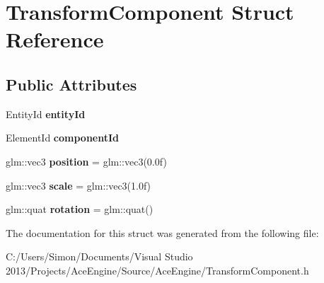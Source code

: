 \hypertarget{struct_transform_component}{}\section{Transform\+Component Struct Reference}
\label{struct_transform_component}
\subsection*{Public Attributes}
\begin{DoxyCompactItemize}
\item 
\hypertarget{struct_transform_component_a92b2cb46b81ef72fd133885df47b0c77}{}Entity\+Id {\bfseries entity\+Id}\label{struct_transform_component_a92b2cb46b81ef72fd133885df47b0c77}

\item 
\hypertarget{struct_transform_component_a41210d33f1663aac14ad30ecc9951d87}{}Element\+Id {\bfseries component\+Id}\label{struct_transform_component_a41210d33f1663aac14ad30ecc9951d87}

\item 
\hypertarget{struct_transform_component_a07035d8d3a70e9935c2355ad0835e0d3}{}glm\+::vec3 {\bfseries position} = glm\+::vec3(0.\+0f)\label{struct_transform_component_a07035d8d3a70e9935c2355ad0835e0d3}

\item 
\hypertarget{struct_transform_component_a4655f45435c9b2403d54ebda6ffafc68}{}glm\+::vec3 {\bfseries scale} = glm\+::vec3(1.\+0f)\label{struct_transform_component_a4655f45435c9b2403d54ebda6ffafc68}

\item 
\hypertarget{struct_transform_component_ad7b9cc2ac98f6c0277e48ae6a1cc67dd}{}glm\+::quat {\bfseries rotation} = glm\+::quat()\label{struct_transform_component_ad7b9cc2ac98f6c0277e48ae6a1cc67dd}

\end{DoxyCompactItemize}


The documentation for this struct was generated from the following file\+:\begin{DoxyCompactItemize}
\item 
C\+:/\+Users/\+Simon/\+Documents/\+Visual Studio 2013/\+Projects/\+Ace\+Engine/\+Source/\+Ace\+Engine/Transform\+Component.\+h\end{DoxyCompactItemize}
